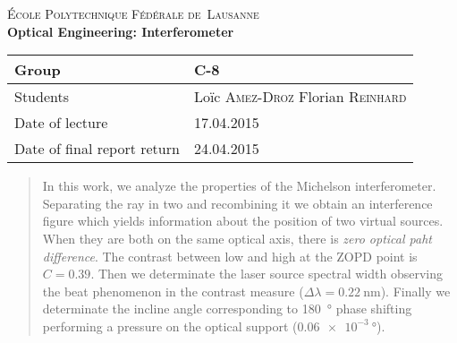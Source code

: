 \begin{titlepage}
\begin{center}
    \textsc{\LARGE École Polytechnique Fédérale de~Lausanne}\\[1.5cm] 
    {\huge \bfseries Optical Engineering: Interferometer}\\[0.4cm] 
    \begin{tabular}{|p{5cm}|p{4cm}|}
        \hline
        Group & C-8 \\ \hline
        Students & Loïc \textsc{Amez-Droz} \newline Florian \textsc{Reinhard} \\ \hline
        Date of lecture & 17.04.2015 \\ \hline
        Date of final report return & 24.04.2015 \\ \hline
    \end{tabular}
\end{center}


\begin{abstract}
    In this work, we analyze the properties of the Michelson interferometer.
    Separating the ray in two and recombining it we obtain an interference figure which yields information about the position of two virtual sources.
    When they are both on the same optical axis, there is \emph{zero optical paht difference}.
    The contrast between low and high at the ZOPD point is $C = 0.39$.
    Then we determinate the laser source spectral width observing the beat phenomenon in the contrast measure ($\Delta \lambda = \SI{0.22}{\nano\meter}$).
    Finally we determinate the incline angle corresponding to \SI{180}{\degree} phase shifting performing a pressure on the optical support ($\SI{0.06e-3}{\degree}$).
\end{abstract}
 
\vfill
\end{titlepage}

